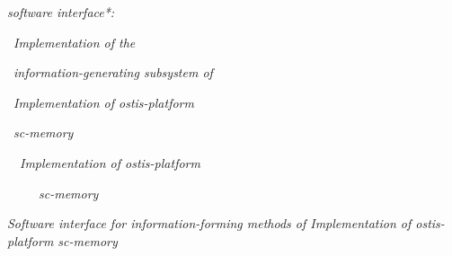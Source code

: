 \documentclass{article}
\begin{document}
\begin{multicols}{2}
\begin{description}[ labelwidth=0.75cm]
 \begin{description}[ labelwidth=0.75cm]
 \vspace{-0.15cm}
 \item[:=] [information-forming methods of Implementation of ostis-platform sc-memory]
 \item[:=] [subsystem that is part of the implementation of ostis-platform sc-memory, which allows creating, modifying, and deleting constructions of sc-memory]
 \item[$\Leftarrow$] \textit{software interface*:}\par  \vspace{-0.08cm}
 \ \textit{Implementation of the} \par \vspace{-0.08cm}
 \  \textit{information-generating subsystem of}\par \vspace{-0.08cm}
 \  \textit{Implementation of ostis-platform}\par \vspace{-0.08cm}
 \  \textit{sc-memory}
 \begin{description}[ labelwidth=0.75cm]
 \vspace{-0.15cm}
 \item[\ \subset]  \ \ \textit{Implementation of ostis-platform}\par
 \ \ \ \ \ \textit{sc-memory}
\end{description} 

\end{description} 

  \item [\supset] \textit{Software interface for information-forming
methods of Implementation of ostis-platform
sc-memory}


\end{description}
\end{multicols}
\end{document}
